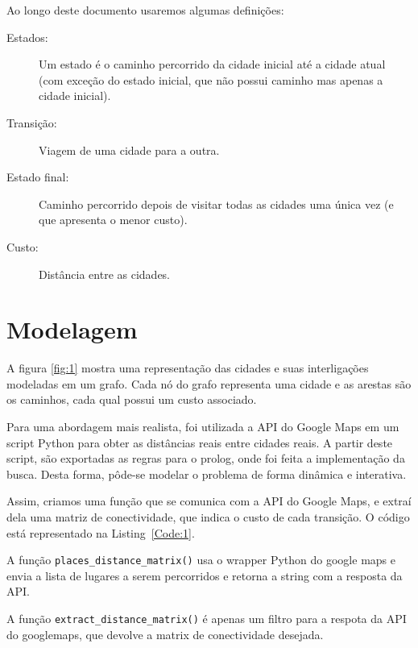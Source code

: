\documentclass[12pt,a4paper]{article}
\begin{document}
Ao longo deste documento usaremos algumas definições:
\begin{description}
  \item 
    [Estados:] Um estado é o caminho percorrido da cidade inicial até a cidade atual (com exceção do estado inicial, que não possui caminho mas apenas a cidade inicial).

  \item[Transição:] Viagem de uma cidade para a outra.

  \item [Estado final:] Caminho percorrido depois de visitar todas as cidades uma única vez (e que apresenta o menor custo).

\item [Custo:] Distância entre as cidades.

\end{description}
	
\newpage
\section{Modelagem}
A figura \ref{fig:1} mostra uma representação das cidades e suas interligações modeladas em um grafo. Cada nó do grafo representa uma cidade e as arestas são os caminhos, cada qual possui um custo associado.

Para uma abordagem mais realista, foi utilizada a API do Google Maps em um script Python para obter as distâncias reais entre cidades reais. A partir deste script, são exportadas as regras para o prolog, onde foi feita a implementação da busca. Desta forma, pôde-se modelar o problema de forma dinâmica e interativa.

Assim, criamos uma função que se comunica com a API do Google Maps, e extraí dela uma matriz de conectividade, que indica o custo de cada transição. O código está representado na Listing~\ref{Code:1}. 

A função \texttt{places_distance_matrix()} usa o wrapper Python do google maps e envia a lista de lugares a serem percorridos e retorna a string com a resposta da API. 

A função \texttt{extract_distance_matrix()} é apenas um filtro para a respota da API do googlemaps, que devolve a matrix de conectividade desejada.
\end{document}
